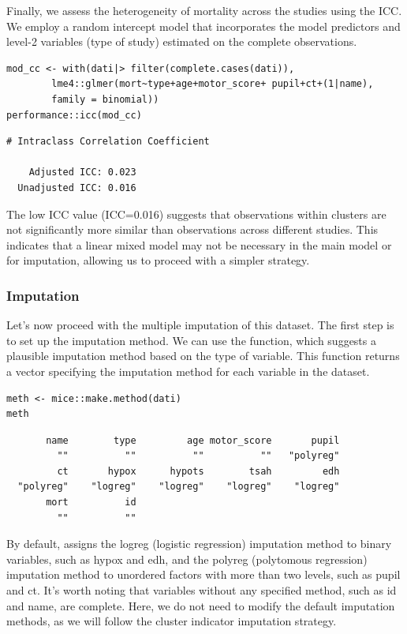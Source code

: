 \documentclass[
  article]{jss}
\begin{document}
Finally, we assess the heterogeneity of mortality across the studies
using the ICC. We employ a random intercept model that incorporates the
model predictors and level-2 variables (type of study) estimated on the
complete observations.

\begin{verbatim}
mod_cc <- with(dati|> filter(complete.cases(dati)),
        lme4::glmer(mort~type+age+motor_score+ pupil+ct+(1|name), 
        family = binomial))
performance::icc(mod_cc) 
\end{verbatim}

\begin{verbatim}
# Intraclass Correlation Coefficient

    Adjusted ICC: 0.023
  Unadjusted ICC: 0.016
\end{verbatim}

The low ICC value (ICC=0.016) suggests that observations within clusters
are not significantly more similar than observations across different
studies. This indicates that a linear mixed model may not be necessary
in the main model or for imputation, allowing us to proceed with a
simpler strategy.

\subsubsection{Imputation}\label{imputation-1}

Let's now proceed with the multiple imputation of this dataset. The
first step is to set up the imputation method. We can use the
 function, which suggests a plausible imputation
method based on the type of variable. This function returns a vector
specifying the imputation method for each variable in the dataset.

\begin{verbatim}
meth <- mice::make.method(dati)
meth
\end{verbatim}

\begin{verbatim}
       name        type         age motor_score       pupil 
         ""          ""          ""          ""   "polyreg" 
         ct       hypox      hypots        tsah         edh 
  "polyreg"    "logreg"    "logreg"    "logreg"    "logreg" 
       mort          id 
         ""          "" 
\end{verbatim}

By default,  assigns the logreg (logistic regression)
imputation method to binary variables, such as hypox and edh, and the
polyreg (polytomous regression) imputation method to unordered factors
with more than two levels, such as pupil and ct. It's worth noting that
variables without any specified method, such as id and name, are
complete. Here, we do not need to modify the default imputation methods,
as we will follow the cluster indicator imputation strategy.
\end{document}
